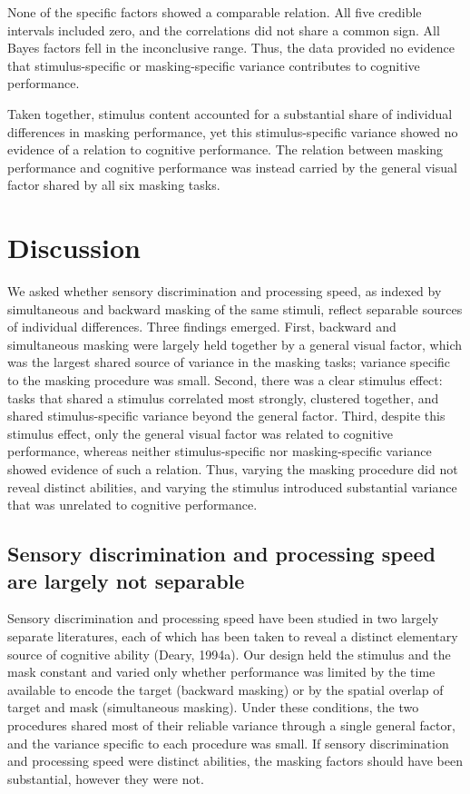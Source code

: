 \documentclass[
  ,man]{apa6}
\begin{document}
None of the specific factors showed a comparable relation. All five credible intervals included zero, and the correlations did not share a common sign. All Bayes factors fell in the inconclusive range. Thus, the data provided no evidence that stimulus-specific or masking-specific variance contributes to cognitive performance.

Taken together, stimulus content accounted for a substantial share of individual differences in masking performance, yet this stimulus-specific variance showed no evidence of a relation to cognitive performance. The relation between masking performance and cognitive performance was instead carried by the general visual factor shared by all six masking tasks.

\section{Discussion}\label{discussion}

We asked whether sensory discrimination and processing speed, as indexed by simultaneous and backward masking of the same stimuli, reflect separable sources of individual differences. Three findings emerged. First, backward and simultaneous masking were largely held together by a general visual factor, which was the largest shared source of variance in the masking tasks; variance specific to the masking procedure was small. Second, there was a clear stimulus effect: tasks that shared a stimulus correlated most strongly, clustered together, and shared stimulus-specific variance beyond the general factor. Third, despite this stimulus effect, only the general visual factor was related to cognitive performance, whereas neither stimulus-specific nor masking-specific variance showed evidence of such a relation. Thus, varying the masking procedure did not reveal distinct abilities, and varying the stimulus introduced substantial variance that was unrelated to cognitive performance.

\subsection{Sensory discrimination and processing speed are largely not separable}\label{sensory-discrimination-and-processing-speed-are-largely-not-separable}

Sensory discrimination and processing speed have been studied in two largely separate literatures, each of which has been taken to reveal a distinct elementary source of cognitive ability (Deary, 1994a). Our design held the stimulus and the mask constant and varied only whether performance was limited by the time available to encode the target (backward masking) or by the spatial overlap of target and mask (simultaneous masking). Under these conditions, the two procedures shared most of their reliable variance through a single general factor, and the variance specific to each procedure was small. If sensory discrimination and processing speed were distinct abilities, the masking factors should have been substantial, however they were not.
\end{document}
